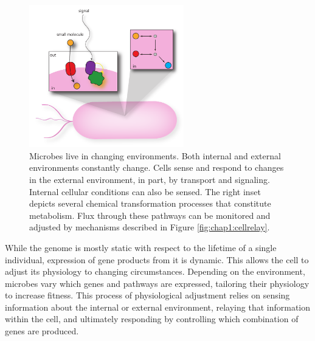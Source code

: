 \begin{figure}[h!]
    \centering
    \includegraphics[width=0.6\textwidth]{figures/cell_env_signal_external}
    \caption[Microbes live in changing environments]{Microbes live in changing environments. Both internal and external environments constantly change. Cells sense and respond to changes in the external environment, in part, by transport and signaling. Internal cellular conditions can also be sensed. The right inset depicts several chemical transformation processes that constitute metabolism. Flux through these pathways can be monitored and adjusted by mechanisms described in Figure \ref{fig:chap1:cellrelay}.}
    \label{fig:chap1:cellsense}
\end{figure}

While the genome is mostly static with respect to the lifetime of a single individual, expression of gene products from it is dynamic. This allows the cell to adjust its physiology to changing circumstances. Depending on the environment, microbes vary which genes and pathways are expressed, tailoring their physiology to increase fitness. This process of physiological adjustment relies on sensing information about the internal or external environment, relaying that information within the cell, and ultimately responding by controlling which combination of genes are produced.   

